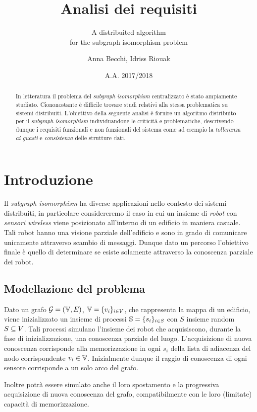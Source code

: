 \documentclass{llncs}
\subtitle{A distribuited algorithm\\for the subgraph isomorphism problem}
\title{Analisi dei requisiti}
\author{Anna Becchi, Idriss Riouak}
\institute{Laurea Magistrale in Informatica\\Universit\`a di Udine, Italy}
\date{A.A. 2017/2018}
\begin{document}
\maketitle
\begin{abstract}
In letteratura il problema del \emph{subgraph isomorphism}
centralizzato è stato ampiamente studiato. Ciononostante è difficile
trovare studi relativi alla stessa problematica su sistemi distribuiti.
L'obiettivo della seguente analisi è fornire un algoritmo distribuito
per il \emph{subgraph isomorphism} individuandone le criticità e
problematiche, descrivendo dunque i requisiti funzionali e non
funzionali del sistema come ad esempio la \emph{tolleranza ai
guasti} e \emph{consistenza} delle strutture dati.
\end{abstract}

\section{Introduzione}
Il \emph{subgraph isomorphism} ha diverse applicazioni nello contesto
dei sistemi distribuiti, in particolare considereremo il caso in cui  un insieme
di \emph{robot} con \emph{sensori wireless} viene posizionato all'interno di
un edificio in maniera casuale. Tali robot hanno una visione parziale dell'edificio
e sono in grado di comunicare unicamente attraverso scambio di messaggi.
Dunque dato un percorso l'obiettivo finale è quello di determinare se esiste
solamente attraverso la conoscenza parziale dei robot.

\subsection{Modellazione del problema}
Dato un grafo $\mathcal{G} = ( \mathbb{V}, E)$, $\mathbb{V} = \{v_i\}_{i \in V}$,
che rappresenta la mappa di un edificio, viene inizializzato un
insieme di processi $\mathbb{S} = \{s_i \}_{i \in S}$ con $S$ insieme
random $S \subseteq V$.
Tali processi simulano l'insieme dei robot che
acquisiscono, durante la fase di inizializzazione, una conoscenza
parziale del luogo. L'acquisizione di nuova conoscenza corrisponde
alla memorizzazione in ogni $s_i$ della lista di adiacenza del nodo
corrispondente $v_i \in \mathbb{V}$.
Inizialmente dunque il raggio di conoscenza di ogni sensore corrisponde
a un solo arco del grafo.

Inoltre potrà essere simulato anche il loro spostamento e la progressiva
acquisizione di nuova conoscenza del grafo, compatibilmente con le
loro (limitate) capacità di memorizzazione.
\end{document}
